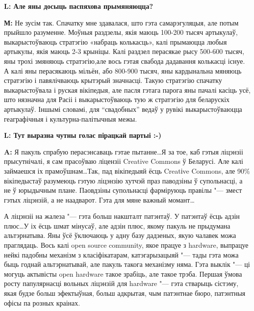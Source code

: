 \documentclass[10pt, a5paper]{article}
\begin{document}
{\noindent \bf L: Але яны досыць паспяхова прымяняюцца?}

{\noindent \bf М:} Не зусім так. Спачатку мне здавалася, што гэта самарэгуляцыя, але потым прыйшло разуменне. Моўныя раздзелы, якія маюць 100-200 тысяч артыкулаў, выкарыстоўваюць стратэгію «набраць колькасць», калі прымаюцца любыя артыкулы, якія маюць 2-3 крыніцы. Калі раздзел перасякае рысу 500-600 тысяч, яны трохі змяняюць стратэгію,але вось гэтая свабода дадавання колькасці існуе. А калі яны перасякаюць мільён, або 800-900 тысяч, яны кардынальна мяняюць стратэгію і павялічваюць крытэрый значнасці. Такую стратэгію спачатку выкарыстоўвала і руская вікіпедыя, але пасля гэтага парога яны пачалі касіць усё, што нязначна для Расіі і выкарыстоўваюць тую ж стратэгію для беларускіх артыкулаў. Іншымі словамі, для “свадобных” ведаў у рувікі выкарыстоўваюцца геаграфічныя і культурна-палітычныя межы.


{\noindent \bf L: Тут выразна чутны голас пірацкай партыі :-)}

{\noindent \bf A:} Я пакуль спрабую перасэнсаваць гэтае пытанне\ldots Я за тое, каб гэтыя ліцэнзіі прысутнічалі, я сам прасоўваю ліцензіі Creative Com\-mons ў Беларусі. Але калі займаешся іх прамоўшнам\ldots Так, пад вікіпедыяй ёсць Creatіve Commons, але 90\% вікіпедыстаў разумеюць гэтую ліцэнзію хутчэй праз паводзіны ў супольнасці, а не ў юрыдычным плане. Паовдзіны супольнасці фарміруюць правілы "--- змест гэтых ліцэнзій, а не наадварот. Гэта для мяне важный момант\ldots

А ліцэнзіі на жалеза "--- гэта больш накшталт патэнтаў. У патэнтаў ёсць адзін плюс\ldots У іх ёсць шмат мінусаў, але адзін плюс, якому пакуль не прыдумана альтэрнатыва. Яны ўсё ўключаюць у адну базу дадзеных, якую чалавек можа праглядаць. Вось калі open source community, якое працуе з hardware, выпрацуе нейкі падобны механізм з класіфікатарам, катэгарызацыяй "--- тады гэта можа быць годнай альтэрнатывай, але пакуль такога механізму няма. Гэта выклік "--- ці могуць актывісты open hardware такое зрабіць, але такое трэба. Першая ўмова росту папулярнасці вольных ліцэнзій для hardware "--- гэта стварыць сістэму, якая будзе больш эфектыўная, больш адкрытая, чым патэнтнае бюро, патэнтныя офісы па розных краінах.

  
 
\end{document}
